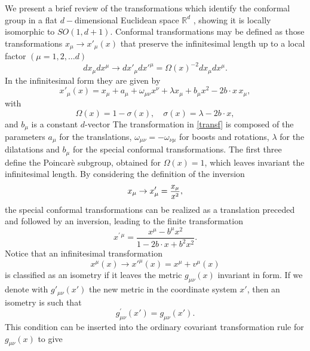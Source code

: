 \documentclass[a4paper,11pt,openright,twoside]{book}
\newcommand{\sdfrac}[2]{\mbox{\small$\displaystyle\frac{#1}{#2}$}}
\numberwithin{equation}{section}
\begin{document}
We present a brief review of the transformations which identify the conformal group in a flat $d-$dimensional Euclidean space $\mathbb{R}^d$ \cite{ DiFrancesco:1997nk,Fradkin:1996is}, showing it is locally isomorphic to $SO(1,d+1)$.
Conformal transformations may be defined as those transformations $x_\mu\to x'_\mu(x)$ that preserve the infinitesimal length up to a local factor $(\mu=1,2,\ldots d)$
\begin{equation}
	dx_\mu dx^\mu\to dx'_\mu dx'^\mu=\Omega(x)^{-2}dx_\mu dx^\mu.\label{lineint}
\end{equation}
In the infinitesimal form they are given by 
\begin{equation}
	x'_\mu(x)=x_\mu+a_\mu+\omega_{\mu\nu}x^\nu+\lambda x_\mu+b_\mu x^2-2b\cdot x\,x_\mu, \label{transf}
\end{equation}
with
\begin{equation}
	\Omega(x)=1-\sigma(x),\quad \sigma(x)=\lambda-2b\cdot x,\label{Om}
\end{equation}
and $b_\mu$ is a constant $d$-vector
The transformation in \eqref{transf} is composed of the parameters $a_\mu$ for the translations, $\omega_{\mu\nu}=-\omega_{\nu\mu}$ for boosts and rotations, $\lambda$ for the dilatations and $b_\mu$ for the special conformal transformations. The first three define the Poincar\`e subgroup, obtained for $\Omega(x)=1$, which leaves invariant the infinitesimal length. By considering the definition of the inversion
\begin{equation}
	x_\mu\to x'_\mu=\sdfrac{x_\mu}{x^2},
\end{equation}
the special conformal transformations can be realized as a translation preceded and followed by an inversion, leading to the finite transformation
\begin{equation}
	x^{\prime\,\mu}=\frac{x^{\mu}-b^{\mu}x^2}{1-2b\cdot x+b^2x^2}.
\end{equation}
Notice that an infinitesimal transformation
\begin{equation}
	x^\mu(x)\to x'^\mu(x)=x^\mu + v^\mu(x)
\end{equation}
is classified as an isometry if it leaves the metric $g_{\mu \nu}(x)$ invariant in form. If we denote with 
$g'_{\mu\nu}(x')$ the new metric in the coordinate system $x'$, then an isometry is such that
\begin{equation}
	g^\prime_{\mu\nu}(x')=g_{\mu\nu}(x').
	\label{met1}
\end{equation}
This condition can be inserted into the ordinary covariant transformation rule for $g_{\mu\nu}(x)$ to give 
\end{document}
